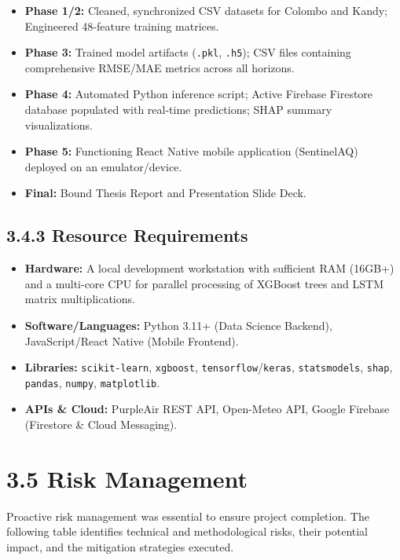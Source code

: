 \begin{itemize}
\tightlist
\item
  \textbf{Phase 1/2:} Cleaned, synchronized CSV datasets for Colombo and
  Kandy; Engineered 48-feature training matrices.
\item
  \textbf{Phase 3:} Trained model artifacts (\texttt{.pkl},
  \texttt{.h5}); CSV files containing comprehensive RMSE/MAE metrics
  across all horizons.
\item
  \textbf{Phase 4:} Automated Python inference script; Active Firebase
  Firestore database populated with real-time predictions; SHAP summary
  visualizations.
\item
  \textbf{Phase 5:} Functioning React Native mobile application
  (SentinelAQ) deployed on an emulator/device.
\item
  \textbf{Final:} Bound Thesis Report and Presentation Slide Deck.
\end{itemize}

\subsection{3.4.3 Resource Requirements}\label{resource-requirements}

\begin{itemize}
\tightlist
\item
  \textbf{Hardware:} A local development workstation with sufficient RAM
  (16GB+) and a multi-core CPU for parallel processing of XGBoost trees
  and LSTM matrix multiplications.
\item
  \textbf{Software/Languages:} Python 3.11+ (Data Science Backend),
  JavaScript/React Native (Mobile Frontend).
\item
  \textbf{Libraries:} \texttt{scikit-learn}, \texttt{xgboost},
  \texttt{tensorflow}/\texttt{keras}, \texttt{statsmodels},
  \texttt{shap}, \texttt{pandas}, \texttt{numpy}, \texttt{matplotlib}.
\item
  \textbf{APIs \& Cloud:} PurpleAir REST API, Open-Meteo API, Google
  Firebase (Firestore \& Cloud Messaging).
\end{itemize}

\section{3.5 Risk Management}\label{risk-management}

Proactive risk management was essential to ensure project completion.
The following table identifies technical and methodological risks, their
potential impact, and the mitigation strategies executed.

